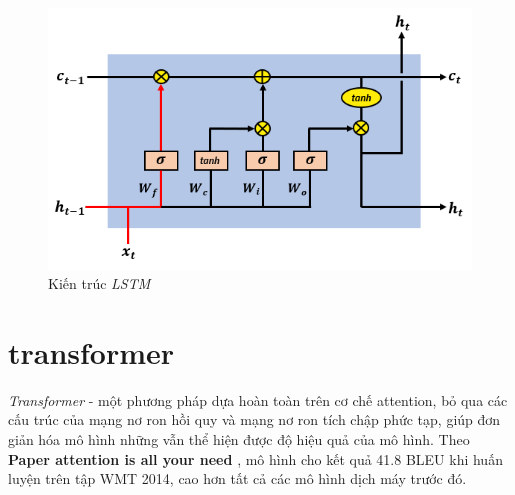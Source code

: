 \begin{figure}[H]
    \begin{center}
        \includegraphics[scale=0.6]{images/lstm}
        \caption{Kiến trúc \textit{LSTM} \cite{lstm}}
        \label{fig:lstm}
    \end{center}
\end{figure}

\section{transformer}

\textit{Transformer} \cite{transformer} - một phương pháp dựa hoàn toàn trên cơ chế attention, bỏ qua các cấu trúc của mạng nơ ron hồi quy và mạng nơ ron tích chập phức tạp, giúp đơn giản hóa mô hình những vẫn thể hiện được độ hiệu quả của mô hình. Theo \textbf{Paper attention is all your need} \cite{transformer}, mô hình cho kết quả 41.8 BLEU khi huấn luyện trên tập WMT 2014, cao hơn tất cả các mô hình dịch máy trước đó. 

